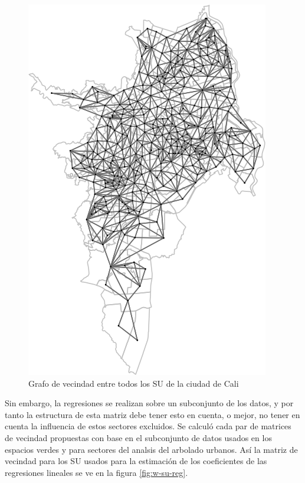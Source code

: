 \documentclass[12pt,]{book}
\begin{document}
\begin{figure}
\includegraphics[width=1\linewidth]{tesis-unigis_files/figure-latex/w-su-todos-1} \caption{Grafo de vecindad entre todos los SU de la ciudad de Cali}\label{fig:w-su-todos}
\end{figure}

Sin embargo, la regresiones se realizan sobre un subconjunto de los
datos, y por tanto la estructura de esta matriz debe tener esto en
cuenta, o mejor, no tener en cuenta la influencia de estos sectores
excluidos. Se calculó cada par de matrices de vecindad propuestas con
base en el subconjunto de datos usados en los espacios verdes y para
sectores del analsis del arbolado urbanos. Así la matriz de vecindad
para los SU usados para la estimación de los coeficientes de las
regresiones lineales se ve en la figura \ref{fig:w-su-reg}.
\end{document}
